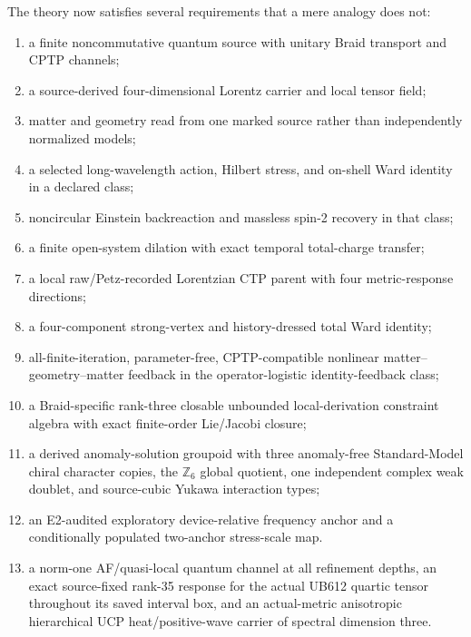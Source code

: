 \documentclass[11pt]{article}
\theoremstyle{definition}
\theoremstyle{remark}
\begin{document}
The theory now satisfies several requirements that a mere analogy does not:
\begin{enumerate}
\item a finite noncommutative quantum source with unitary Braid transport and CPTP channels;
\item a source-derived four-dimensional Lorentz carrier and local tensor field;
\item matter and geometry read from one marked source rather than independently normalized models;
\item a selected long-wavelength action, Hilbert stress, and on-shell Ward identity in a declared class;
\item noncircular Einstein backreaction and massless spin-2 recovery in that class;
\item a finite open-system dilation with exact temporal total-charge transfer;
\item a local raw/Petz-recorded Lorentzian CTP parent with four metric-response directions;
\item a four-component strong-vertex and history-dressed total Ward identity;
\item all-finite-iteration, parameter-free, CPTP-compatible nonlinear matter--geometry--matter feedback in the operator-logistic identity-feedback class;
\item a Braid-specific rank-three closable unbounded local-derivation constraint algebra with exact finite-order Lie/Jacobi closure;
\item a derived anomaly-solution groupoid with three anomaly-free Standard-Model chiral character copies, the $\mathbb Z_6$ global quotient, one independent complex weak doublet, and source-cubic Yukawa interaction types;
\item an E2-audited exploratory device-relative frequency anchor and a conditionally populated two-anchor stress-scale map.
\item a norm-one AF/quasi-local quantum channel at all refinement depths, an exact source-fixed rank-35 response for the actual UB612 quartic tensor throughout its saved interval box, and an actual-metric anisotropic hierarchical UCP heat/positive-wave carrier of spectral dimension three.
\end{enumerate}
\end{document}
